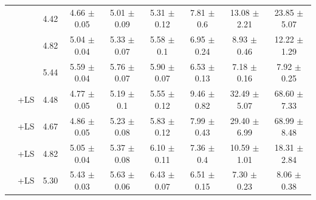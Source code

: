 \begin{table}[t]
\begin{tabular}{| c | l | c | c | c | c | c | c | c |}
		& \Clipping[$0.15$] & 4.42 & 4.66 {\color{gray}\scriptsize ${\pm}$0.05} & 5.01 {\color{gray}\scriptsize ${\pm}$0.09} & 5.31 {\color{gray}\scriptsize ${\pm}$0.12} & 7.81 {\color{gray}\scriptsize ${\pm}$0.6} & 13.08 {\color{gray}\scriptsize ${\pm}$2.21} & 23.85 {\color{gray}\scriptsize ${\pm}$5.07}\\
		& \Clipping[$0.1$] & 4.82 & 5.04 {\color{gray}\scriptsize ${\pm}$0.04} & 5.33 {\color{gray}\scriptsize ${\pm}$0.07} & 5.58 {\color{gray}\scriptsize ${\pm}$0.1} & 6.95 {\color{gray}\scriptsize ${\pm}$0.24} & 8.93 {\color{gray}\scriptsize ${\pm}$0.46} & 12.22 {\color{gray}\scriptsize ${\pm}$1.29}\\
		& \Clipping[$0.05$] & 5.44 & 5.59 {\color{gray}\scriptsize ${\pm}$0.04} & 5.76 {\color{gray}\scriptsize ${\pm}$0.07} & 5.90 {\color{gray}\scriptsize ${\pm}$0.07} & 6.53 {\color{gray}\scriptsize ${\pm}$0.13} & 7.18 {\color{gray}\scriptsize ${\pm}$0.16} & 7.92 {\color{gray}\scriptsize ${\pm}$0.25}\\
		\cline{2-9} 
		& \Clipping[$0.2$]+LS & 4.48 & 4.77 {\color{gray}\scriptsize ${\pm}$0.05} & 5.19 {\color{gray}\scriptsize ${\pm}$0.1} & 5.55 {\color{gray}\scriptsize ${\pm}$0.12} & 9.46 {\color{gray}\scriptsize ${\pm}$0.82} & 32.49 {\color{gray}\scriptsize ${\pm}$5.07} & 68.60 {\color{gray}\scriptsize ${\pm}$7.33}\\
		& \Clipping[$0.15$]+LS & 4.67 & 4.86 {\color{gray}\scriptsize ${\pm}$0.05} & 5.23 {\color{gray}\scriptsize ${\pm}$0.08} & 5.83 {\color{gray}\scriptsize ${\pm}$0.12} & 7.99 {\color{gray}\scriptsize ${\pm}$0.43} & 29.40 {\color{gray}\scriptsize ${\pm}$6.99} & 68.99 {\color{gray}\scriptsize ${\pm}$8.48}\\
		& \Clipping[$0.1$]+LS & 4.82 & 5.05 {\color{gray}\scriptsize ${\pm}$0.04} & 5.37 {\color{gray}\scriptsize ${\pm}$0.08} & 6.10 {\color{gray}\scriptsize ${\pm}$0.11} & 7.36 {\color{gray}\scriptsize ${\pm}$0.4} & 10.59 {\color{gray}\scriptsize ${\pm}$1.01} & 18.31 {\color{gray}\scriptsize ${\pm}$2.84}\\
		& \Clipping[$0.05$]+LS & 5.30 & 5.43 {\color{gray}\scriptsize ${\pm}$0.03} & 5.63 {\color{gray}\scriptsize ${\pm}$0.06} & 6.43 {\color{gray}\scriptsize ${\pm}$0.07} & 6.51 {\color{gray}\scriptsize ${\pm}$0.15} & 7.30 {\color{gray}\scriptsize ${\pm}$0.23} & 8.06 {\color{gray}\scriptsize ${\pm}$0.38}\\
		\hline
	\end{tabular}
	\vspace*{-0.1cm}
\end{table}

